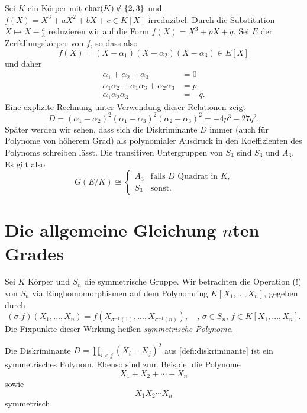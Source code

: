 \documentclass{book}
\begin{document}
\begin{exa}
    \label{exa:cubedisc}
    Sei $K$ ein Körper mit $\operatorname{char}(K) \notin \{2,3\}$ und $f(X) = X^3 + a X^2
    + bX + c \in K[X]$ irreduzibel. Durch die Substitution $X \mapsto X -
    \frac{a}{3}$ reduzieren wir auf die Form $f(X) = X^3 + p X + q$. Sei $E$ der Zerfällungskörper von $f$, so dass also
    \[
        f(X) = (X - \alpha_1) (X - \alpha_2) (X - \alpha_3) \in E[X]
    \]
    und daher
    \begin{align*}
        \alpha_1 + \alpha_2 + \alpha_3 & = 0\\
        \alpha_1\alpha_2 + \alpha_1\alpha_3 + \alpha_2\alpha_3 & = p\\
        \alpha_1\alpha_2\alpha_3 & = -q.
    \end{align*}
    Eine explizite Rechnung unter Verwendung dieser Relationen zeigt
    \[
        D = (\alpha_1 - \alpha_2)^2(\alpha_1 - \alpha_3)^2(\alpha_2 - \alpha_3)^2 = -4 p^3 - 27 q^2.
    \]
    Später werden wir sehen, dass sich die Diskriminante $D$ immer (auch für
    Polynome von höherem Grad) als polynomialer Ausdruck in den Koeffizienten
    des Polynoms schreiben lässt. Die transitiven Untergruppen von $S_3$ sind
    $S_3$ und $A_3$. Es gilt also
    \[
        G(E/K) \cong \begin{cases} A_3 & \text{falls $D$ Quadrat in $K$,} \\ S_3 & \text{sonst.} \end{cases}
    \]
\end{exa}

\section{Die allgemeine Gleichung $n$ten Grades}%
\label{sub:die_allgemeine_gleichung_n_ten_grades}

Sei $K$ Körper und $S_n$ die symmetrische Gruppe. Wir betrachten die
Operation (!) von $S_n$ via Ringhomomorphismen auf dem Polynomring $K[X_1, ..., X_n]$, gegeben durch 
\begin{equation}\label{eq:snwirkung}
        (\sigma.f)(X_1, ..., X_n) = f(X_{\sigma^{-1}(1)},..., X_{\sigma^{-1}(n)}), \quad \text{, $\sigma \in S_n$, $f \in K[X_1,...,X_n]$.}
\end{equation}
Die Fixpunkte dieser Wirkung heißen \emph{symmetrische Polynome}.

\begin{exa}
    \label{exa:sym}
    Die Diskriminante $D = \prod_{i<j} (X_i - X_j)^2$ aus \eqref{defi:diskriminante} ist ein symmetrisches Polynom. Ebenso sind zum Beispiel die Polynome
    \[
        X_1 + X_2 + \cdots + X_n 
    \]
    sowie
    \[
        X_1 X_2 \cdots X_n
    \]
    symmetrisch.
\end{exa}
\end{document}
